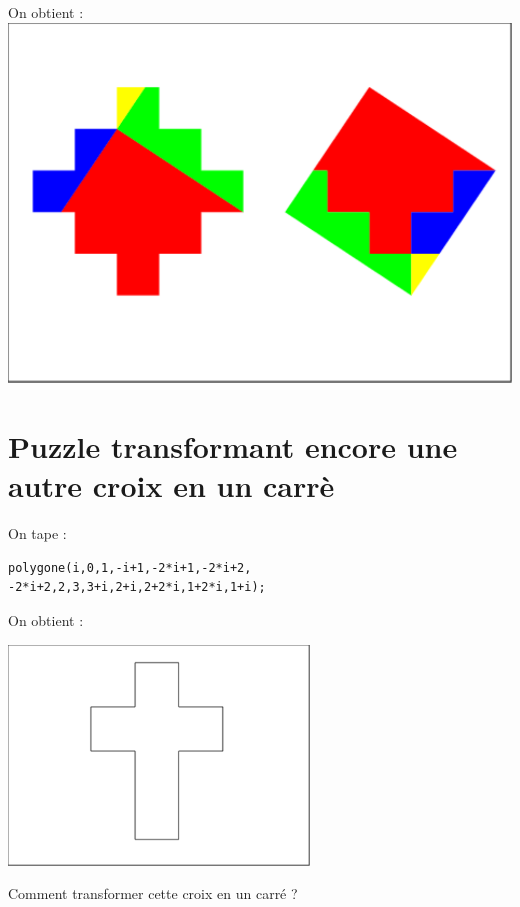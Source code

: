 \documentclass[a4paper,11pt]{book}
\begin{document}
On obtient :\\
\includegraphics[width=\textwidth]{puzzlecroix5}

\section{Puzzle transformant encore une autre croix en un carr\`e}
On tape :
\begin{verbatim}
polygone(i,0,1,-i+1,-2*i+1,-2*i+2,
-2*i+2,2,3,3+i,2+i,2+2*i,1+2*i,1+i);
\end{verbatim}
On obtient :\\
\begin{center}\includegraphics[width=8cm]{puzzlecroix6}\end{center}
Comment transformer cette croix en un carr\'e ?
\end{document}
